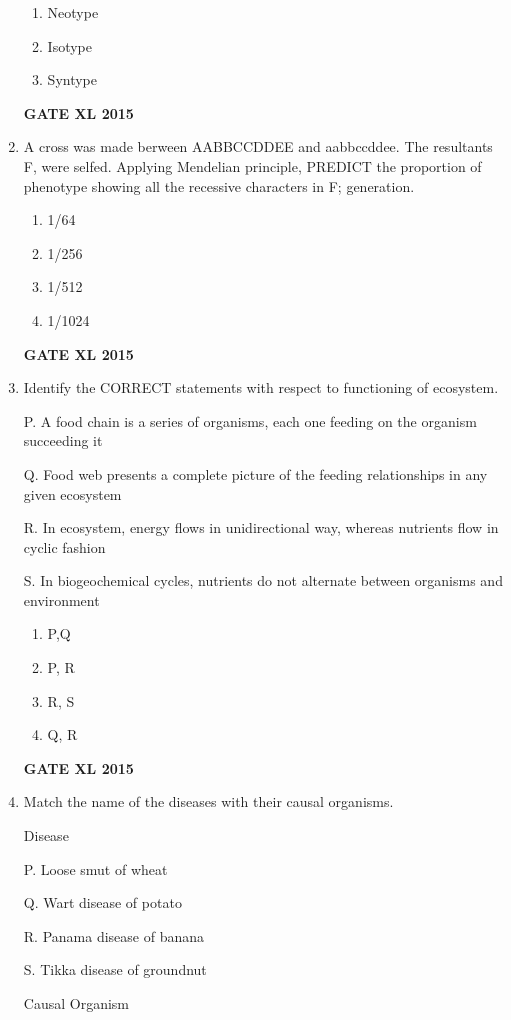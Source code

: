 \documentclass[journal,12pt,onecolumn]{IEEEtran}
\begin{document}
\begin{enumerate}
\begin{enumerate}
	    \item Neotype
	    \item Isotype
            \item Syntype
    \end{enumerate}
\hfill{\textbf{GATE XL 2015}}
\item A cross was made berween AABBCCDDEE and aabbccddee. The resultants F, were selfed. Applying Mendelian principle, PREDICT the proportion of phenotype showing all the recessive characters in F; generation.
    \begin{enumerate}
            \item 1/64
	    \item 1/256
	    \item 1/512
            \item 1/1024
    \end{enumerate}
\hfill{\textbf{GATE XL 2015}}
\item Identify the CORRECT statements with respect to functioning of ecosystem.

P. A food chain is a series of organisms, each one feeding on the organism succeeding it

Q. Food web presents a complete picture of the feeding relationships in any given ecosystem

R. In ecosystem, energy flows in unidirectional way, whereas nutrients flow in cyclic fashion

S. In biogeochemical cycles, nutrients do not alternate between organisms and environment
    \begin{enumerate}
            \item P,Q
	    \item P, R
	    \item R, S
            \item Q, R
    \end{enumerate}
\hfill{\textbf{GATE XL 2015}}
\item Match the name of the diseases with their causal organisms.

\begin{minipage}{0.5\textwidth}
	\begin{flushleft}
Disease

P. Loose smut of wheat

Q. Wart disease of potato

R. Panama disease of banana

S. Tikka disease of groundnut

	\end{flushleft}
\end{minipage}
\begin{minipage}{0.5\textwidth}
	\begin{flushleft}
Causal Organism


\end{flushleft}
\end{minipage}
\end{enumerate}
\end{document}
